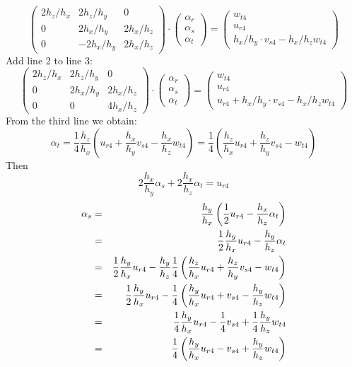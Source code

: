 \[
\left(
\begin{array}{ccc}
2h_z/h_x & 2h_z/h_y & 0 \\
0        & 2h_x/h_y & 2h_x/h_z \\
0        & -2h_x/h_y & 2h_x/h_z 
\end{array}
\right)
\cdot
\left(
\begin{array}{c}
\alpha_r \\ \alpha_s \\ \alpha_t
\end{array}
\right)
=
\left(
\begin{array}{c}
w_{t4} \\
u_{r4} \\
h_x/h_y \cdot v_{s4} - h_x/h_z w_{t4}
\end{array}
\right)
\]
Add line 2 to line 3:
\[
\left(
\begin{array}{ccc}
2h_z/h_x & 2h_z/h_y & 0 \\
0        & 2h_x/h_y & 2h_x/h_z \\
0        & 0 & 4h_x/h_z 
\end{array}
\right)
\cdot
\left(
\begin{array}{c}
\alpha_r \\ \alpha_s \\ \alpha_t
\end{array}
\right)
=
\left(
\begin{array}{c}
w_{t4} \\
u_{r4} \\
u_{r4} + h_x/h_y \cdot v_{s4} - h_x/h_z w_{t4}
\end{array}
\right)
\]
From the third line we obtain:
\[
\alpha_t = \frac14 \frac{h_z}{h_x} \left(u_{r4} + \frac{h_x}{h_y} v_{s4} - \frac{h_x}{h_z} w_{t4} \right)
= \frac14 \left(  \frac{h_z}{h_x} u_{r4} +\frac{h_z}{h_y} v_{s4}-  w_{t4}  \right)
\]
Then
\[
2 \frac{h_x}{h_y} \alpha_s + 2\frac{h_x}{h_z} \alpha_t = u_{r4}
\]
\begin{eqnarray}
\alpha_s  
&=& \frac{h_y}{h_x} \left( \frac12 u_{r4} -  \frac{h_x}{h_z} \alpha_t \right) \nonumber \\
&=& \frac12 \frac{h_y}{h_x} u_{r4} - \frac{h_y}{h_z} \alpha_t \nonumber\\ 
&=& \frac12 \frac{h_y}{h_x} u_{r4} - \frac{h_y}{h_z} \frac14 \left(  \frac{h_z}{h_x} u_{r4} +\frac{h_z}{h_y} v_{s4}-  w_{t4}  \right)\nonumber \\
&=& \frac12 \frac{h_y}{h_x} u_{r4} -  \frac14 \left(  \frac{h_y}{h_x} u_{r4} + v_{s4}-  \frac{h_y}{h_z} w_{t4}  \right) \nonumber\\
&=& \frac14 \frac{h_y}{h_x} u_{r4} - \frac14 v_{s4} + \frac14 \frac{h_y}{h_z} w_{t4}  \nonumber\\
&=& \frac14 \left( \frac{h_y}{h_x} u_{r4} - v_{s4} +  \frac{h_y}{h_z} w_{t4}  \right) \nonumber
\end{eqnarray}
